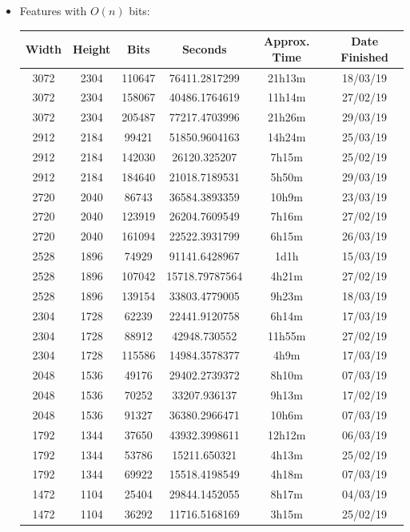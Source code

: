 \documentclass[11pt,a4paper]{report}
\begin{document}
\begin{itemize}
\newpage
\item Features with $O(n)$ bits:
  \begin{center}
  \begin{tabular}{ c c c | c c c }
  Width & Height & Bits & Seconds & Approx. Time & Date Finished \\ \hline
  3072 & 2304 & 110647 & 76411.2817299 & 21h13m & 18/03/19 \\
  3072 & 2304 & 158067 & 40486.1764619 & 11h14m & 27/02/19 \\
  3072 & 2304 & 205487 & 77217.4703996 & 21h26m & 29/03/19 \\
  2912 & 2184 & 99421 & 51850.9604163 & 14h24m & 25/03/19 \\
  2912 & 2184 & 142030 & 26120.325207 & 7h15m & 25/02/19 \\
  2912 & 2184 & 184640 & 21018.7189531 & 5h50m & 29/03/19 \\
  2720 & 2040 & 86743 & 36584.3893359 & 10h9m & 23/03/19 \\
  2720 & 2040 & 123919 & 26204.7609549 & 7h16m & 27/02/19 \\
  2720 & 2040 & 161094 & 22522.3931799 & 6h15m & 26/03/19 \\
  2528 & 1896 & 74929 & 91141.6428967 & 1d1h & 15/03/19 \\
  2528 & 1896 & 107042 & 15718.79787564 & 4h21m & 27/02/19 \\
  2528 & 1896 & 139154 & 33803.4779005 & 9h23m & 18/03/19 \\
  2304 & 1728 & 62239 & 22441.9120758 & 6h14m & 17/03/19 \\
  2304 & 1728 & 88912 & 42948.730552 & 11h55m & 27/02/19 \\
  2304 & 1728 & 115586 & 14984.3578377 & 4h9m & 17/03/19 \\
  2048 & 1536 & 49176 & 29402.2739372 & 8h10m & 07/03/19 \\
  2048 & 1536 & 70252 & 33207.936137 & 9h13m & 17/02/19 \\
  2048 & 1536 & 91327 & 36380.2966471 & 10h6m & 07/03/19 \\
  1792 & 1344 & 37650 & 43932.3998611 & 12h12m & 06/03/19 \\
  1792 & 1344 & 53786 & 15211.650321 & 4h13m & 25/02/19 \\
  1792 & 1344 & 69922 & 15518.4198549 & 4h18m & 07/03/19 \\
  1472 & 1104 & 25404 & 29844.1452055 & 8h17m & 04/03/19 \\
  1472 & 1104 & 36292 & 11716.5168169 & 3h15m & 25/02/19 \\

\end{tabular}
\end{center}
\end{itemize}
\end{document}
